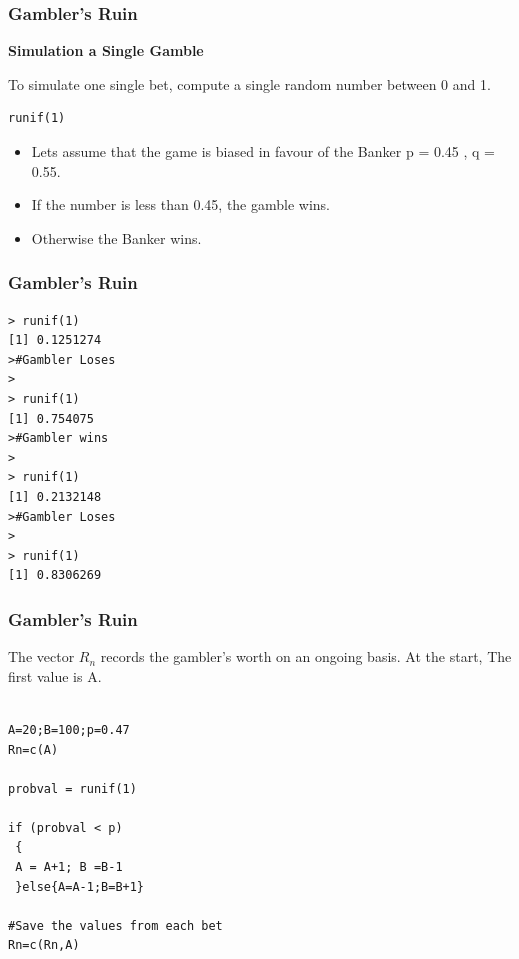 \documentclass[MAIN.tex]{subfiles}
\begin{document}
\begin{frame}[fragile]
	\frametitle{Gambler's Ruin}
\large

\textbf{Simulation a Single Gamble}


To simulate one single bet, compute a single random number between 0 and 1.
\begin{framed}
\begin{verbatim}
runif(1)
\end{verbatim}
\end{framed}
\begin{itemize}
	\item Lets assume that the game is biased in favour of the Banker
	p = 0.45 , q = 0.55.
	\item If the number is less than 0.45, the gamble wins. 
	\item Otherwise the Banker wins.
\end{itemize}
\end{frame}
\begin{frame}[fragile]
	\frametitle{Gambler's Ruin}

\begin{verbatim}
> runif(1)
[1] 0.1251274
>#Gambler Loses
>
> runif(1)
[1] 0.754075
>#Gambler wins
>
> runif(1)
[1] 0.2132148
>#Gambler Loses
>
> runif(1)
[1] 0.8306269
\end{verbatim}

\end{frame}
\begin{frame}[fragile]
	\frametitle{Gambler's Ruin}
The vector $R_n$ records the gambler's worth on an ongoing basis. At the start, The first value is A.
\begin{framed}
\begin{verbatim}

A=20;B=100;p=0.47
Rn=c(A)

probval = runif(1)

if (probval < p)
 {
 A = A+1; B =B-1
 }else{A=A-1;B=B+1}

#Save the values from each bet
Rn=c(Rn,A)
\end{verbatim}
\end{framed}

\end{frame}
\end{document}
